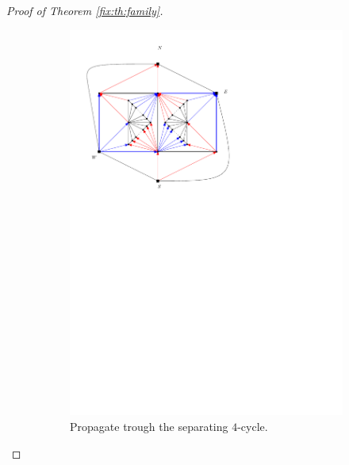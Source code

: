 \begin{proof}[Proof of Theorem \ref{fix:th:family}]
\begin{figure}[h]
\begin{subfigure}[t]{0.3\textwidth}
      \includegraphics[width=\textwidth]{fixExtension/img/manymany2}
      \caption{Propagate trough the separating $4$-cycle.}
      \label{fig:fix:manymany2}
    \end{subfigure}
    \quad
    \begin{subfigure}[t]{0.3\textwidth}

\end{subfigure}
\end{figure}
\end{proof}
